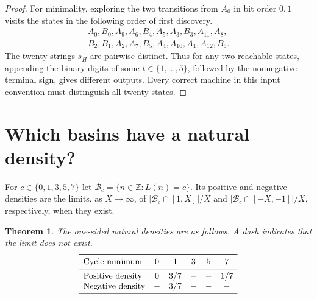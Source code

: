 \documentclass[11pt,a4paper]{article}
\newtheorem{theorem}{Theorem}
\newcommand{\Z}{\mathbb Z}
\newcommand{\B}{\mathcal B}
\begin{document}
\begin{proof}
For minimality, exploring the two transitions from $A_0$ in bit order $0,1$ visits the states in the following order of first discovery.
\[
\begin{gathered}
 A_0,B_0,A_9,A_6,B_4,A_5,A_3,B_3,A_{11},A_8,\\
 B_2,B_1,A_2,A_7,B_5,A_4,A_{10},A_1,A_{12},B_6 .
\end{gathered}
\]
The twenty strings $s_H$ are pairwise distinct. Thus for any two reachable states, appending the binary digits of some $t\in\{1,\ldots,5\}$, followed by the nonnegative terminal sign, gives different outputs. Every correct machine in this input convention must distinguish all twenty states.
\end{proof}

\newpage
\section{Which basins have a natural density?}
For $c\in\{0,1,3,5,7\}$ let $\B_c=\{n\in\Z:L(n)=c\}$. Its positive and negative densities are the limits, as $X\to\infty$, of $|\B_c\cap[1,X]|/X$ and $|\B_c\cap[-X,-1]|/X$, respectively, when they exist.

\begin{theorem}
The one-sided natural densities are as follows. A dash indicates that the limit does not exist.
\[
\begin{array}{lccccc}
\toprule
 \text{Cycle minimum} & 0&1&3&5&7\\
\midrule
 \text{Positive density} &0&3/7&-&-&1/7\\
 \text{Negative density} &-&3/7&-&-&-\\
\bottomrule
\end{array}
\]
\end{theorem}
\end{document}
